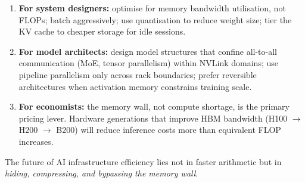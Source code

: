 \documentclass[11pt,a4paper]{article}
\begin{document}
\begin{enumerate}[leftmargin=*]
  \item \textbf{For system designers:} optimise for memory bandwidth
    utilisation, not FLOPs; batch aggressively; use quantisation to reduce
    weight size; tier the KV cache to cheaper storage for idle sessions.

  \item \textbf{For model architects:} design model structures that confine
    all-to-all communication (MoE, tensor parallelism) within NVLink domains;
    use pipeline parallelism only across rack boundaries; prefer reversible
    architectures when activation memory constrains training scale.

  \item \textbf{For economists:} the memory wall, not compute shortage, is
    the primary pricing lever. Hardware generations that improve HBM
    bandwidth (H100 $\to$ H200 $\to$ B200) will reduce inference costs
    more than equivalent FLOP increases.

\end{enumerate}

The future of AI infrastructure efficiency lies not in faster arithmetic
but in \textit{hiding, compressing, and bypassing the memory wall}.
\end{document}
